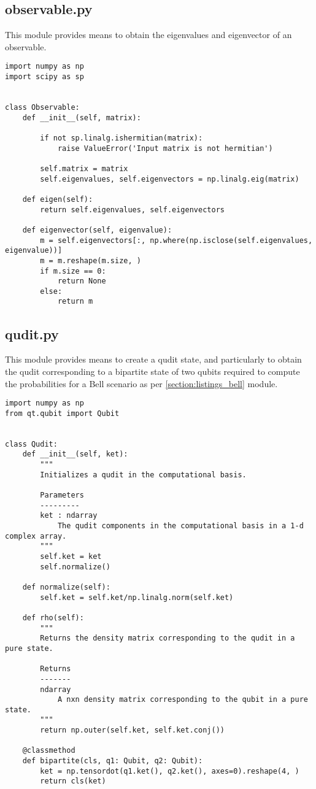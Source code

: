 \subsection{observable.py}\label{section:listings_observable}
This module provides means to obtain the eigenvalues and eigenvector of an observable. 
\begin{verbatim}
import numpy as np
import scipy as sp


class Observable:
    def __init__(self, matrix):

        if not sp.linalg.ishermitian(matrix):
            raise ValueError('Input matrix is not hermitian')

        self.matrix = matrix
        self.eigenvalues, self.eigenvectors = np.linalg.eig(matrix)

    def eigen(self):
        return self.eigenvalues, self.eigenvectors

    def eigenvector(self, eigenvalue):
        m = self.eigenvectors[:, np.where(np.isclose(self.eigenvalues, eigenvalue))]
        m = m.reshape(m.size, )
        if m.size == 0:
            return None
        else:
            return m
\end{verbatim}
\newpage
\subsection{qudit.py}\label{section:listings_qudit}
This module provides means to create a qudit state, and particularly to obtain the qudit corresponding to a bipartite state of two qubits required to compute the probabilities for a Bell scenario as per \ref{section:listings_bell} module. 
\begin{verbatim}
import numpy as np
from qt.qubit import Qubit


class Qudit:
    def __init__(self, ket):
        """
        Initializes a qudit in the computational basis.

        Parameters
        ---------
        ket : ndarray
            The qudit components in the computational basis in a 1-d complex array.
        """
        self.ket = ket
        self.normalize()

    def normalize(self):
        self.ket = self.ket/np.linalg.norm(self.ket)

    def rho(self):
        """
        Returns the density matrix corresponding to the qudit in a pure state.

        Returns
        -------
        ndarray
            A nxn density matrix corresponding to the qubit in a pure state.
        """
        return np.outer(self.ket, self.ket.conj())

    @classmethod
    def bipartite(cls, q1: Qubit, q2: Qubit):
        ket = np.tensordot(q1.ket(), q2.ket(), axes=0).reshape(4, )
        return cls(ket)
\end{verbatim}
\newpage
